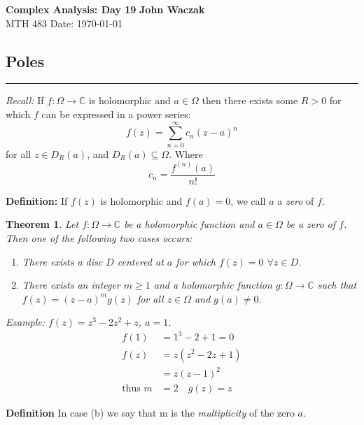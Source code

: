 \documentclass[a4paper, 11pt]{article}
\newtheorem*{theorem}{Theorem}
\begin{document}
\noindent
\large\textbf{Complex Analysis: Day 19} \hfill \textbf{John Waczak} \\
\normalsize MTH 483 \hfill  Date: \today \\

\subsection*{Poles} 
	\par\noindent\rule{\textwidth}{0.4pt}
	
	\noindent \textit{Recall:} If $f:\Omega\to\mathbb{C}$ is holomorphic and $a\in\Omega$ then there exists some $R>0$ for which $f$ can be expressed in a power series:
		\begin{equation*}
			f(z) = \sum\limits_{n=0}^\infty c_n(z-a)^n 
		\end{equation*}
	for all $z\in D_R(a)$, and $D_R(a)\subseteq\Omega$. Where
		\begin{equation*}
			c_n = \frac{f^{(n)}(a)}{n!}
		\end{equation*}

	\noindent \textbf{Definition:} If $f(z)$ is holomorphic and $f(a)=0$, we call $a$ a \textit{zero} of $f$. \\
	
	\begin{theorem}
		Let $f:\Omega\to\mathbb{C}$ be a holomorphic function and $a\in\Omega$ be a zero of $f$. Then one of the following two cases occurs: 
			\begin{enumerate}[label=\alph*]
				\item There exists a disc $D$ centered at $a$ for which $f(z)=0$ $\forall z\in D$. 
				\item There exists an integer $m\geq1$ and a holomorphic function $g:\Omega\to\mathbb{C}$ such that $f(z)=(z-a)^mg(z)$ for all $z\in\Omega$ and $g(a)\neq 0$. 
			\end{enumerate}
		
		\noindent \textit{Example:} $f(z)=z^3-2z^2+z$, $a=1$. 
			\begin{align*}
				f(1) &= 1^3-2+1 = 0 \\ 
				f(z) &= z(z^2-2z+1) \\ 
					&= z(z-1)^2 \\ 
				\text{thus } m&=2 \quad g(z)=z 
			\end{align*}
	\end{theorem}


	\noindent\textbf{Definition} In case (b) we say that m is the \textit{multiplicity} of the zero $a$. 
	
\end{document}
